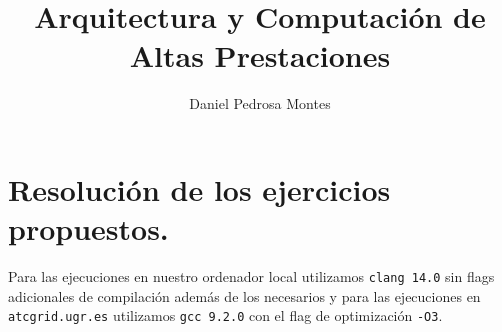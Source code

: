 \documentclass[10pt, a4paper]{aqademic}
\author{Daniel Pedrosa Montes}
\title{Arquitectura y Computación de Altas Prestaciones}
\begin{document}
\AqMaketitle[%
	cover    = identidad_ugr,
    subtitle = Manejo de MPI,
    url      = https://github.com/moshidev,
    date     = marzo del 2023 
]

\tableofcontents

\chapter{Resolución de los ejercicios propuestos.}
    Para las ejecuciones en nuestro ordenador local utilizamos \texttt{clang 14.0} sin flags
    adicionales de compilación además de los necesarios y para las ejecuciones en \texttt{atcgrid.ugr.es}
    utilizamos \texttt{gcc 9.2.0} con el flag de optimización \texttt{-O3}.

    
    \pagebreak
    
    \pagebreak
    



\end{document}

